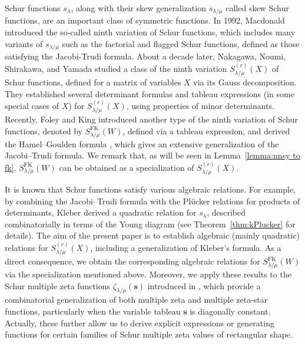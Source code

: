 \documentclass[12pt]{amsart}%
\theoremstyle{definition}
\newcommand{\FK}{\mathrm{FK}}
\begin{document}
Schur functions $s_{\lambda}$, along with their skew generalization $s_{\lambda/\mu}$ called skew Schur functions, 
are an important class of symmetric functions.
In 1992, Macdonald \cite{ma92} introduced the so-called ninth variation of Schur functions, 
which includes many variants of $s_{\lambda/\mu}$ such as the factorial and flagged Schur functions,
defined as those satisfying the Jacobi-Trudi formula. 
About a decade later, Nakagawa, Noumi, Shirakawa, and Yamada \cite{nnsy}
studied a class of the ninth variation $S^{(r)}_{\lambda/\mu}(X)$ of Schur functions,
defined for a matrix of variables $X$ via its Gauss decomposition.
They established several determinant formulas and tableau expressions (in some special cases of $X$) for $S^{(r)}_{\lambda/\mu}(X)$,
using properties of minor determinants.
Recently, Foley and King \cite{fk21} introduced another type of the ninth variation of Schur functions, denoted by $S^{\FK}_{\lambda/\mu}(W)$, defined via a tableau expression, and derived the Hamel–Goulden formula \cite{hg}, which gives an extensive generalization of the Jacobi–Trudi formula.
We remark that, as will be seen in Lemma~\ref{lemma:nnsy to fk}, $S^{\FK}_{\lambda/\mu}(W)$ can be obtained as a specialization of $S^{(r)}_{\lambda/\mu}(X)$. 

It is known that Schur functions satisfy various algebraic relations.
For example, by combining the Jacobi–Trudi formula with the Pl\"ucker relations for products of determinants, Kleber \cite{k01} derived a quadratic relation for $s_{\lambda}$, described combinatorially in terms of the Young diagram (see Theorem~\ref{thm:kPlucker} for details).
The aim of the present paper is to establish algebraic (mainly quadratic) relations for $S^{(r)}_{\lambda/\mu}(X)$, including a generalization of Kleber’s formula.
As a direct consequence, we obtain the corresponding algebraic relations for $S^{\FK}_{\lambda/\mu}(W)$ via the specialization mentioned above.
Moreover, we apply these results to the Schur multiple zeta functions $\zeta_{\lambda/\mu}(\boldsymbol{s})$ introduced in \cite{npy}, which provide a combinatorial generalization of both multiple zeta and multiple zeta-star functions, particularly when the variable tableau $\boldsymbol{s}$ is diagonally constant.
Actually, these further allow us to derive explicit expressions or generating functions for certain families of Schur multiple zeta values of rectangular shape.

\end{document}
